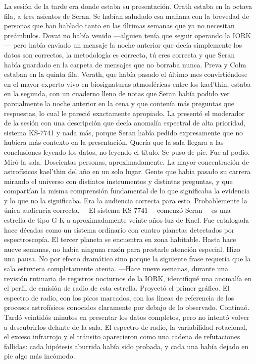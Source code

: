 \documentclass[11pt,a5paper,twoside]{book}
\begin{document}
La sesión de la tarde era donde estaba su presentación.
Orath estaba en la octava fila, a tres asientos de Seran. Se habían saludado esa mañana con la brevedad de personas que han hablado tanto en las últimas semanas que ya no necesitan preámbulos. Dovat no había venido —alguien tenía que seguir operando la IORK— pero había enviado un mensaje la noche anterior que decía simplemente los datos son correctos, la metodología es correcta, tú eres correcta y que Seran había guardado en la carpeta de mensajes que no borraba nunca.
Preva y Colm estaban en la quinta fila. Verath, que había pasado el último mes convirtiéndose en el mayor experto vivo en biosignaturas atmosféricas entre los kael'thin, estaba en la segunda, con un cuaderno lleno de notas que Seran había podido ver parcialmente la noche anterior en la cena y que contenía más preguntas que respuestas, lo cual le pareció exactamente apropiado.
La presentó el moderador de la sesión con una descripción que decía anomalía espectral de alta prioridad, sistema KS-7741 y nada más, porque Seran había pedido expresamente que no hubiera más contexto en la presentación. Quería que la sala llegara a las conclusiones leyendo los datos, no leyendo el título.
Se puso de pie. Fue al podio. Miró la sala.
Doscientas personas, aproximadamente. La mayor concentración de astrofísicos kael'thin del año en un solo lugar. Gente que había pasado su carrera mirando el universo con distintos instrumentos y distintas preguntas, y que compartían la misma comprensión fundamental de lo que significaba la evidencia y lo que no la significaba.
Era la audiencia correcta para esto. Probablemente la única audiencia correcta.
—El sistema KS-7741 —comenzó Seran— es una estrella de tipo G-K a aproximadamente veinte años luz de Kael. Fue catalogada hace décadas como un sistema ordinario con cuatro planetas detectados por espectroscopía. El tercer planeta se encuentra en zona habitable. Hasta hace nueve semanas, no había ninguna razón para prestarle atención especial.
Hizo una pausa. No por efecto dramático sino porque la siguiente frase requería que la sala estuviera completamente atenta.
—Hace nueve semanas, durante una revisión rutinaria de registros nocturnos de la IORK, identifiqué una anomalía en el perfil de emisión de radio de esta estrella.
Proyectó el primer gráfico. El espectro de radio, con los picos marcados, con las líneas de referencia de los procesos astrofísicos conocidos claramente por debajo de lo observado.
Continuó.
Tardó veintidós minutos en presentar los datos completos, pero no intentó volver a descubrirlos delante de la sala. El espectro de radio, la variabilidad rotacional, el exceso infrarrojo y el tránsito aparecieron como una cadena de refutaciones fallidas: cada hipótesis aburrida había sido probada, y cada una había dejado en pie algo más incómodo.
\end{document}
